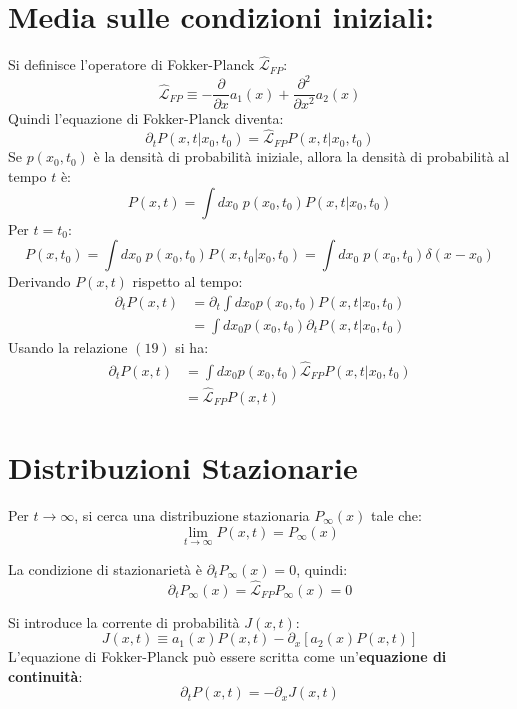 \section{Media sulle condizioni iniziali:}

Si definisce l'operatore di Fokker-Planck $\hat{\mathcal{L}}_{FP}$:
\begin{equation}
\hat{\mathcal{L}}_{FP} \equiv -\frac{\partial}{\partial x}a_1(x) + \frac{\partial^2}{\partial x^2}a_2(x)
\end{equation}
Quindi l'equazione di Fokker-Planck diventa:
\begin{equation}
\partial_t P(x,t|x_0,t_0) = \hat{\mathcal{L}}_{FP} P(x,t|x_0,t_0)
\end{equation}
Se $p(x_0,t_0)$ è la densità di probabilità iniziale, allora la densità di probabilità al tempo $t$ è:
\begin{equation}
P(x,t) = \int dx_0  \;p(x_0,t_0) P(x,t|x_0,t_0)
\end{equation}
Per $t=t_0$:
\begin{equation}
P(x,t_0) = \int dx_0 \; p(x_0,t_0) P(x,t_0|x_0,t_0) = \int dx_0 \; p(x_0,t_0) \delta(x-x_0) 
\end{equation}
Derivando $P(x,t)$ rispetto al tempo:
\begin{align}
\partial_t P(x,t) &= \partial_t \int dx_0 p(x_0,t_0) P(x,t|x_0,t_0)  \nonumber \\ &= \int dx_0 p(x_0,t_0) \partial_t P(x,t|x_0,t_0)
\end{align}
Usando la relazione $(19)$ si ha:
\begin{align}
\partial_t P(x,t) &= \int dx_0 p(x_0,t_0) \hat{\mathcal{L}}_{FP} P(x,t|x_0,t_0) \nonumber \\ &= \hat{\mathcal{L}}_{FP} P(x,t)
\end{align}

\section{Distribuzioni Stazionarie}
Per $t \rightarrow \infty$, si cerca una distribuzione stazionaria $P_{\infty}(x)$ tale che: 
$$
\lim_{t \rightarrow \infty} P(x,t) = P_{\infty}(x)
$$

La condizione di stazionarietà è $\partial_t P_{\infty}(x) = 0$, quindi:
\begin{equation}
\partial_t P_{\infty}(x) =\hat{\mathcal{L}}_{FP} P_{\infty}(x) = 0
\end{equation}


Si introduce la corrente di probabilità $J(x,t)$:
\begin{equation}
J(x,t) \equiv a_1(x)P(x,t) - \partial_x [a_2(x)P(x,t)]
\end{equation}
L'equazione di Fokker-Planck può essere scritta come un'\textbf{equazione di continuità}:
\begin{equation}
\partial_t P(x,t) = -\partial_x J(x,t)
\end{equation}


